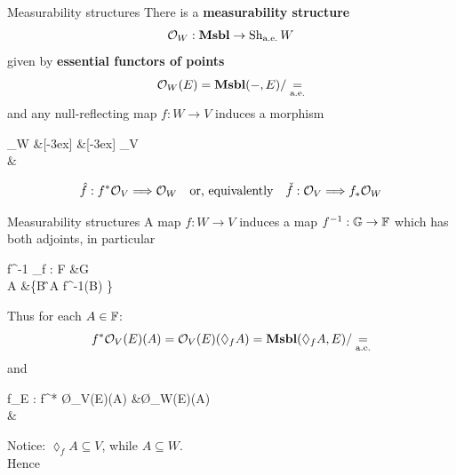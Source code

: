 \begin{frame}{Measurability structures}
	There is a \textbf{measurability structure}
	\begin{equation*}
		\mathcal{O}_W : \mathbf{Msbl} \to \operatorname{Sh}_{\text{a.e.}} W
	\end{equation*}
	given by \textbf{essential functors of points}
	\begin{equation*}
		\mathcal{O}_W(E) = \mathbf{Msbl}(-, E) / \underset{\text{a.e.}}{=}
	\end{equation*}
	and any null-reflecting map $f : W \to V$ induces a morphism
	\begin{diagram*}
		\Sh_\aetop W \&[-3ex] \&[-3ex] \Sh_\aetop V\\
		\& \Msbl
		\arrow[""{name=0, anchor=center, inner sep=0}, "{f_*}"', shift right=2, from=1-1, to=1-3]
		\arrow[""{name=1, anchor=center, inner sep=0}, "{f^*}"', shift right=2, from=1-3, to=1-1]
		\arrow["{\O_W}", from=2-2, to=1-1]
		\arrow[""{name=2, anchor=center, inner sep=0}, "{\O_V}"', from=2-2, to=1-3]
		\arrow["\dashv"{anchor=center, rotate=-90}, draw=none, from=1, to=0]
		\arrow[shorten <=20pt, shorten >=30pt, shift left=2, Rightarrow, "\hat f", from=2, to=1-1]
	\end{diagram*}
	\begin{equation*}
		\hat f : f^*\mathcal{O}_V \Longrightarrow \mathcal{O}_W \quad\text{or, equivalently}\quad \check f : \mathcal{O}_V \Longrightarrow f_*\mathcal{O}_W
	\end{equation*}
\end{frame}

\begin{frame}{Measurability structures}
	A map $f:W \to V$ induces a map $f^{-1} :\mathbb{G} \to \mathbb{F}$ which has both adjoints, in particular
	\begin{eqalign*}
		f^{-1} \vdash \lozenge_f : \alg F &\longto \alg G\\
						A	&\longmapsto \bigwedge \{B \in \G \suchthat A \leq f^{-1}(B) \}
	\end{eqalign*}

	\vfill
	Thus for each $A \in \mathbb{F}$:
	\begin{equation*}
		f^*\mathcal{O}_V(E)(A) = \mathcal{O}_V(E)(\lozenge_f A) = \mathbf{Msbl}(\lozenge_f A, E) / \underset{\text{a.e.}}{=}
	\end{equation*}
	and
	\begin{eqalign*}
		\hat f_E : f^* \O_V(E)(A) &\longto \O_W(E)(A)\\
		 &\longmapsto \gold{A \into \lozenge_f A \nto{g} E}
	\end{eqalign*}

	\vfill
	Notice: $\lozenge_f A \subseteq V$, while $A \subseteq W$.\\
	Hence 
\end{frame}

